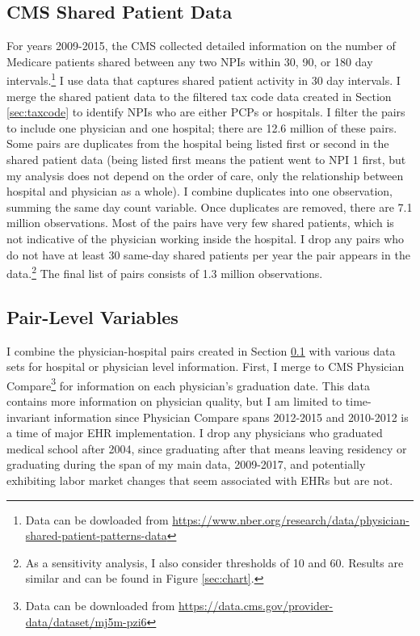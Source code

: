 \documentclass[12pt]{article}
\begin{document}
\subsection{CMS Shared Patient Data}\label{sec:sharedpat}

For years 2009-2015, the CMS collected detailed information on the number of Medicare patients shared between any two NPIs within 30, 90, or 180 day intervals.\footnote{Data can be dowloaded from \hyperlink{https://www.nber.org/research/data/physician-shared-patient-patterns-data}{https://www.nber.org/research/data/physician-shared-patient-patterns-data}} I use data that captures shared patient activity in 30 day intervals. I merge the shared patient data to the filtered tax code data created in Section \ref{sec:taxcode} to identify NPIs who are either PCPs or hospitals. I filter the pairs to include one physician and one hospital; there are 12.6 million of these pairs. Some pairs are duplicates from the hospital being listed first or second in the shared patient data (being listed first means the patient went to NPI 1 first, but my analysis does not depend on the order of care, only the relationship between hospital and physician as a whole). I combine duplicates into one observation, summing the same day count variable. Once duplicates are removed, there are 7.1 million observations. Most of the pairs have very few shared patients, which is not indicative of the physician working inside the hospital. I drop any pairs who do not have at least 30 same-day shared patients per year the pair appears in the data.\footnote{As a sensitivity analysis, I also consider thresholds of 10 and 60. Results are similar and can be found in Figure \ref{sec:chart}.} The final list of pairs consists of 1.3 million observations. 

\subsection{Pair-Level Variables}

I combine the physician-hospital pairs created in Section \ref{sec:sharedpat} with various data sets for hospital or physician level information. First, I merge to CMS Physician Compare\footnote{Data can be downloaded from \hyperlink{https://data.cms.gov/provider-data/dataset/mj5m-pzi6}{https://data.cms.gov/provider-data/dataset/mj5m-pzi6}} for information on each physician's graduation date. This data contains more information on physician quality, but I am limited to time-invariant information since Physician Compare spans 2012-2015 and 2010-2012 is a time of major EHR implementation. I drop any physicians who graduated medical school after 2004, since graduating after that means leaving residency or graduating during the span of my main data, 2009-2017, and potentially exhibiting labor market changes that seem associated with EHRs but are not. 
\end{document}
